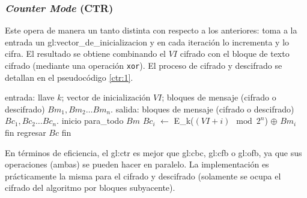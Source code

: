 %
%

\subsubsection{\textit{Counter Mode} (CTR)}
\label{sec:ctr}

Este opera de manera un tanto distinta con respecto a los anteriores: toma a
la entrada un \gls{gl:vector_de_inicializacion} y en cada iteración lo
incrementa y lo cifra. El resultado se obtiene combinando el $ VI $ cifrado
con el bloque de texto cifrado (mediante una operación \verb|xor|). El proceso
de cifrado y descifrado se detallan en el pseudocódigo \ref{ctr:1}.

\begin{pseudocodigo}[%
    caption={\Gls{gl:modo_de_operacion} \gls{gl:ctr}%
      (cifrado y descifrado).},
    label={ctr:1}%
  ]
    entrada: llave $ k $; vector de inicialización $ VI $;
             bloques de mensaje (cifrado o descifrado) $ Bm_1, Bm_2 \dots Bm_n $.
    salida:  bloques de mensaje (cifrado o descifrado) $ Bc_1, Bc_2 \dots Bc_n $.
    inicio
      para_todo $Bm$
        $Bc_i$ $\gets$ E_k($ (VI + i) \mod 2^n $) $\oplus$ $Bm_i$
      fin
      regresar $Bc$
    fin
\end{pseudocodigo}

En términos de eficiencia, el \gls{gl:ctr} es mejor que \gls{gl:cbc},
\gls{gl:cfb} o \gls{gl:ofb}, ya que sus operaciones (ambas) se pueden hacer
en paralelo. La implementación es prácticamente la misma para el cifrado y
descifrado (solamente se ocupa el cifrado del algoritmo por bloques
subyacente).

